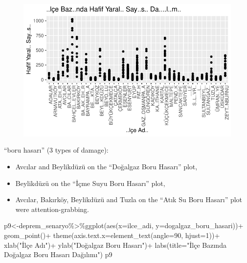 \documentclass[
  11pt,
  a4paper,
  DIV=11,
  numbers=noendperiod]{scrartcl}
\newenvironment{Shaded}{\begin{snugshade}}{\end{snugshade}}
\newcommand{\AttributeTok}[1]{\textcolor[rgb]{0.40,0.45,0.13}{#1}}
\newcommand{\DecValTok}[1]{\textcolor[rgb]{0.68,0.00,0.00}{#1}}
\newcommand{\FunctionTok}[1]{\textcolor[rgb]{0.28,0.35,0.67}{#1}}
\newcommand{\NormalTok}[1]{\textcolor[rgb]{0.00,0.23,0.31}{#1}}
\newcommand{\OtherTok}[1]{\textcolor[rgb]{0.00,0.23,0.31}{#1}}
\newcommand{\SpecialCharTok}[1]{\textcolor[rgb]{0.37,0.37,0.37}{#1}}
\newcommand{\StringTok}[1]{\textcolor[rgb]{0.13,0.47,0.30}{#1}}
\begin{document}
\begin{figure}[H]

{\centering \includegraphics{project_files/figure-pdf/unnamed-chunk-4-4.pdf}

}

\end{figure}

``boru hasarı'' (3 types of damage):

\begin{itemize}
\item
  Avcılar and Beylikdüzü on the ``Doğalgaz Boru Hasarı'' plot,
\item
  Beylikdüzü on the ``İçme Suyu Boru Hasarı'' plot,
\item
  Avcılar, Bakırköy, Beylikdüzü and Tuzla on the ``Atık Su Boru Hasarı''
  plot were attention-grabbing.
\end{itemize}

\begin{Shaded}
\begin{Highlighting}[]
\NormalTok{p9}\OtherTok{\textless{}{-}}\NormalTok{deprem\_senaryo}\SpecialCharTok{\%\textgreater{}\%}\FunctionTok{ggplot}\NormalTok{(}\FunctionTok{aes}\NormalTok{(}\AttributeTok{x=}\NormalTok{ilce\_adi, }\AttributeTok{y=}\NormalTok{dogalgaz\_boru\_hasari))}\SpecialCharTok{+}
  \FunctionTok{geom\_point}\NormalTok{()}\SpecialCharTok{+}
  \FunctionTok{theme}\NormalTok{(}\AttributeTok{axis.text.x=}\FunctionTok{element\_text}\NormalTok{(}\AttributeTok{angle=}\DecValTok{90}\NormalTok{, }\AttributeTok{hjust=}\DecValTok{1}\NormalTok{))}\SpecialCharTok{+}
  \FunctionTok{xlab}\NormalTok{(}\StringTok{"İlçe Adı"}\NormalTok{)}\SpecialCharTok{+}
  \FunctionTok{ylab}\NormalTok{(}\StringTok{"Doğalgaz Boru Hasarı"}\NormalTok{)}\SpecialCharTok{+}
  \FunctionTok{labs}\NormalTok{(}\AttributeTok{title=}\StringTok{"İlçe Bazında Doğalgaz Boru Hasarı Dağılımı"}\NormalTok{)}
\NormalTok{p9}
\end{Highlighting}
\end{Shaded}
\end{document}

